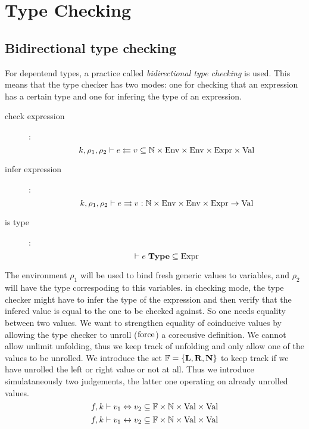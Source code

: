\section{Type Checking}

\renewcommand\Check[5]{#1,#2,#3\vdash#4\leftleftarrows#5}
\newcommand\IsType[1]{\vdash#1\;\mathbf{Type}}
\newcommand\Infer[5]{#1,#2,#3\vdash#4\rightrightarrows#5}
\newcommand\EqVal[4]{#1,#2\vdash#3\Leftrightarrow#4}
\newcommand\FeqVal[4]{#1,#2\vdash#3{\;\leftrightarrow\;}#4}
\newcommand\DeqVal[2]{\vdash#1\leftrightarrow#2}
\newcommand\LeqVal[4]{#1,#2,\vdash#3\leq#4}
\newcommand\FleqVal[4]{#1,#2\vdash#3{\;\ll\;}#4}
\newcommand\DLeqVal[2]{\vdash#1\leq#2}
\newcommand\SzLeq[2]{\vdash#1\sqsubseteq#2}

\subsection{Bidirectional type checking} 
For depentend types, a practice called \emph{bidirectional type checking} is used.
This means that the type checker has two modes:
one for checking that an expression has a certain type and one for infering the type of an expression.

\begin{description}
\item[check expression]:
\[\Check{k}{\rho_1}{\rho_2}{e}{v} \subseteq \cN \times \Env \times \Env \times \Expr \times \Val\]
\item[infer expression]:
\[\Infer{k}{\rho_1}{\rho_2}{e}{v} : \cN \times \Env \times \Env \times \Expr \ra \Val\]
\item[is type]:
\[\IsType{e} \subseteq \Expr\]
\end{description}

The environment $\rho_1$ will be used to bind fresh generic values to variables, and $\rho_2$ will have the type correspoding to this variables. in checking mode, the type checker might have to infer the type of the expression and then verify that the infered value is equal to the one to be checked against.
So one needs equality between two values.
We want to strengthen equality of coinducive values by allowing the type checker to unroll ($\mathrm{force}$) a corecusive definition. We cannot allow unlimit unfolding, thus we keep track of unfolding and only allow one of the values to be unrolled.
We introduce the set $ \mathbb{F} = \{\mathbf{L}, \mathbf{R}, \mathbf{N} \} $ to keep track if we have unrolled the left or right value or not at all.
Thus we introduce simulataneously two judgements, the latter one operating on already unrolled values.
\[\EqVal{f}{k}{v_1}{v_2} \subseteq \cF \times \cN \times \Val \times \Val \]
\[\FeqVal{f}{k}{v_1}{v_2} \subseteq \cF \times \cN \times\Val \times \Val \]


